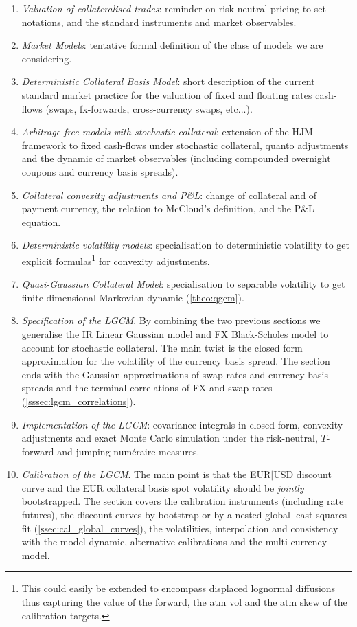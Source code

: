 \documentclass[11pt,english]{amsart}
\theoremstyle{definition}
\begin{document}
\begin{enumerate}
\item \emph{Valuation of collateralised trades}: reminder on risk-neutral pricing to set notations, and the standard instruments and market observables.
\item \emph{Market Models}: tentative formal definition of the class of models we are considering.
\item \emph{Deterministic Collateral Basis Model}: short description of the current standard market practice for the valuation of fixed and floating rates cash-flows (swaps, fx-forwards, cross-currency swaps, etc...). 
\item \emph{Arbitrage free models with stochastic collateral}: extension of the HJM framework to fixed cash-flows under stochastic collateral, quanto adjustments and the dynamic of market observables (including compounded overnight coupons and currency basis spreads).
\item \emph{Collateral convexity adjustments and P\&L}: change of collateral and of payment currency, the relation to McCloud's definition, and the P\&L equation.
\item \emph{Deterministic volatility models}: specialisation to deterministic volatility to get explicit formulas\footnote{This could easily be extended to encompass displaced lognormal diffusions thus capturing the value of the forward, the atm vol and the atm skew of the calibration targets.} for convexity adjustments.
\item \emph{Quasi-Gaussian Collateral Model}: specialisation to separable volatility to get finite dimensional Markovian dynamic (\autoref{theo:qgcm}).
\item \emph{Specification of the LGCM}. By combining the two previous sections we generalise the IR Linear Gaussian model and FX Black-Scholes model to account for stochastic collateral. The main twist is the closed form approximation for the volatility of the currency basis spread. The section ends with the Gaussian approximations of swap rates and currency basis spreads and the terminal correlations of FX and swap rates (\autoref{sssec:lgcm_correlations}).
\item \emph{Implementation of the LGCM}: covariance integrals in closed form, convexity adjustments and exact Monte Carlo simulation under the risk-neutral, $T$-forward and jumping num\'eraire measures.
\item \emph{Calibration of the LGCM}. The main point is that the EUR$|$USD discount curve and the EUR collateral basis spot volatility should be \emph{jointly} bootstrapped. The section covers the calibration instruments (including rate futures), the discount curves by bootstrap or by a nested global least squares fit (\autoref{ssec:cal_global_curves}), the volatilities, interpolation and consistency with the model dynamic, alternative calibrations and the multi-currency model.

\end{enumerate}
\end{document}
